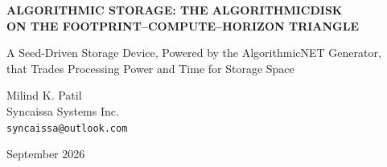 \documentclass[11pt,a4paper]{article}
\theoremstyle{definition}
\theoremstyle{plain}
\theoremstyle{remark}
\begin{document}
\begin{center}
  {\Large\bfseries ALGORITHMIC STORAGE: THE ALGORITHMICDISK\\[2pt]
   ON THE FOOTPRINT--COMPUTE--HORIZON TRIANGLE\par}
  \vspace{10pt}
  {\normalsize A Seed-Driven Storage Device, Powered by the AlgorithmicNET Generator,\\[3pt]
   that Trades Processing Power and Time for Storage Space\par}
  \vspace{12pt}
  {\normalsize Milind K. Patil\\ Syncaissa Systems Inc.\\ \texttt{syncaissa@outlook.com}\par}
  \vspace{8pt}
  {\normalsize September 2026\par}
\end{center}
\vspace{8pt}
\end{document}
